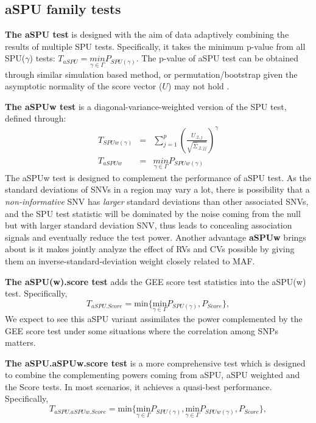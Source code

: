 \documentclass[12pt]{article}
\begin{document}
\subsection*{aSPU family tests}
\textbf{The aSPU test} is designed with the aim of data adaptively combining the results of
multiple SPU tests. Specifically, it takes the minimum p-value from
all SPU($\gamma$) tests: $T_{aSPU}=\underset{\gamma\in\Gamma}{min}P_{SPU(\gamma)}$.
The p-value of aSPU test can be obtained through similar simulation based
method, or permutation/bootstrap given the asymptotic normality of the
score vector ($U$) may not hold \cite{pan2014powerful}.

\textbf{The aSPUw test }is a diagonal-variance-weighted version of the SPU
test, defined through: 
\begin{eqnarray*}
T_{SPUw(\gamma)} & = & \sum_{j=1}^{p}\left(\frac{U_{.2,j}}{\sqrt{\hat{\Sigma}_{.2,jj}}}\right)^{\gamma}\\
T_{aSPUw} & = & \underset{\gamma\in\Gamma}{min}P_{SPUw(\gamma)}
\end{eqnarray*}
The aSPUw test is designed to complement the performance of aSPU test. As the standard deviations of SNVs in a region may vary a lot, there is possibility that a \textit{non-informative} SNV has \textit{larger} standard deviations than other associated SNVs, and the SPU test statistic will be dominated by the noise coming from the null but with larger standard deviation SNV, thus leads to concealing association signals and eventually reduce the test power. Another advantage \textbf{aSPUw} brings about is it makes jointly analyze the effect of RVs and CVs possible by giving them an inverse-standard-deviation weight closely related to MAF. 

\textbf{The aSPU(w).score test} adds the GEE score test statistics
into the aSPU(w) test. 
Specifically,
$$
T_{aSPU.Score} = \textrm{min} \Big\{ \underset{\gamma\in\Gamma}{ \textrm{min} } P_{ SPU(\gamma) }, P_{Score} \Big\},
$$ 
We expect to see this
aSPU variant assimilates the power complemented by the GEE score test under some situations where the correlation among SNPs matters.

\textbf{The aSPU.aSPUw.score test} is a more comprehensive test which is designed to combine the complementing powers coming from aSPU, aSPU weighted and the Score tests. In most scenarios, it achieves a quasi-best performance. Specifically, 
$$
T_{aSPU.aSPUw.Score} = \textrm{min} \Big\{ \underset{\gamma\in\Gamma}{ \textrm{min} } P_{ SPU(\gamma) },\underset{\gamma\in\Gamma}{ \textrm{min} } P_{ SPUw(\gamma) }, P_{Score} \Big\},
$$ 
\end{document}
